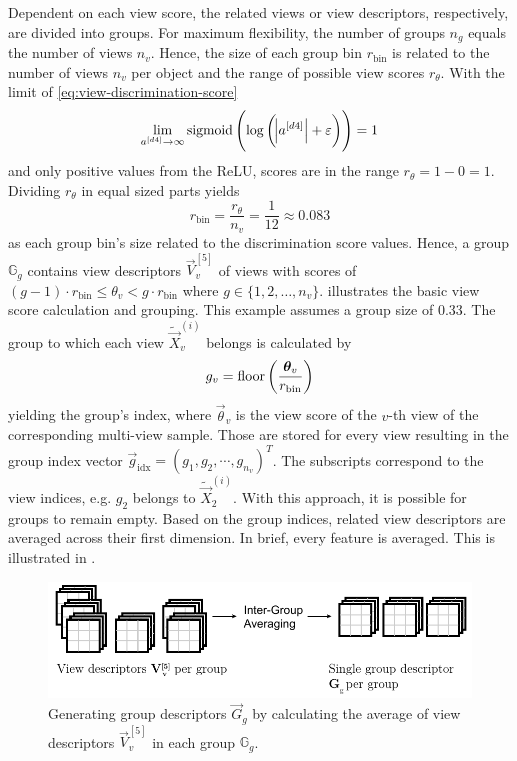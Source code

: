 Dependent on each view score, the related views or view descriptors, respectively, are divided into groups.
For maximum flexibility, the number of groups $n_g$ equals the number of views $n_v$.
Hence, the size of each group bin $r_{\text{bin}}$ is related to the number of views $n_v$ per object and the range of possible view scores $r_\theta$.
With the limit of \eqref{eq:view-discrimination-score}
\begin{equation}
	\lim_{a^{[d4]}\rightarrow \infty} \operatorname{sigmoid}\left( \log \left( \abs{a^{[d4]}} + \varepsilon \right) \right) = 1
\end{equation}
and only positive values from the ReLU, scores are in the range $r_\theta = 1 - 0 = 1$.
Dividing $r_\theta$ in equal sized parts yields
\begin{equation}
	r_{\text{bin}} = \frac{r_\theta}{n_v} = \frac{1}{12} \approx 0.083
\end{equation}
as each group bin's size related to the discrimination score values.
Hence, a group $\mathbb{G}_g$ contains view descriptors $\vec{V}_v^{[5]}$ of views with scores of $(g-1) \cdot r_{\text{bin}} \leq \theta_v < g \cdot r_{\text{bin}}$ where $g \in \{1,2, \dots, n_v\}$.
 illustrates the basic view score calculation and grouping.
This example assumes a group size of $0.33$.
The group to which each view $\tilde{\vec{X}}^{(i)}_v$ belongs is calculated by
\begin{equation}
	g_v = \operatorname{floor} \left( \frac{\bm{\theta}_v}{r_{\text{bin}}} \right)
\end{equation}
yielding the group's index, where $\vec{\theta}_v$ is the view score of the $v$-th view of the corresponding multi-view sample.
Those are stored for every view resulting in the group index vector $\vec{g}_{\text{idx}} = \left( g_1, g_2, \cdots, g_{n_v}\right)^T$.
The subscripts correspond to the view indices, e.g. $g_2$ belongs to $\tilde{\vec{X}}^{(i)}_2$.
With this approach, it is possible for groups to remain empty.
Based on the group indices, related view descriptors are averaged across their first dimension.
In brief, every feature is averaged.
This is illustrated in .
\begin{figure}
	\centering
	\includegraphics[]{images/grouping_module_group_descriptors.pdf}
	\caption[Generating group descriptors]{Generating group descriptors $\vec{G}_g$ by calculating the average of view descriptors $\vec{V}^{[5]}_v$ in each group $\mathbb{G}_g$.}
	\label{fig:grouping-module-group-descriptors}
\end{figure}
